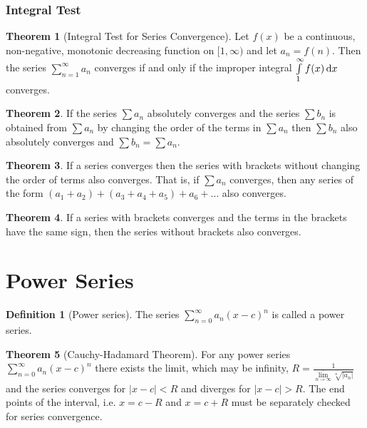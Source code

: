 \documentclass[fleqn, a4paper, 8pt, twoside]{amsart}
\theoremstyle{definition}
\theoremstyle{bluedefinition}
\newtheorem{definition}{Definition}
\theoremstyle{redtheorem}
\newtheorem{theorem}{Theorem}
\begin{document}
\begin{multicols}{2}
\begin{spacing}{0.7}
\subsubsection{Integral Test}

\begin{theorem}[Integral Test for Series Convergence]
	Let $f(x)$ be a continuous, non-negative, monotonic decreasing function on $[1,\infty)$ and let $a_n = f(n)$.
	Then the series $\sum\limits_{n = 1}^{\infty} a_n$ converges if and only if the improper integral $\int\limits_{1}^{\infty} f(x) \dif x$ converges.
	\label{Integral Test for Series Convergence}
\end{theorem}

\begin{theorem}
	If the series $\sum a_n$ absolutely converges and the series $\sum b_n$ is obtained from $\sum a_n$ by changing the order of the terms in $\sum a_n$ then $\sum b_n$ also absolutely converges and $\sum b_n = \sum a_n$.
\end{theorem}

\begin{theorem}
	If a series converges then the series with brackets without changing the order of terms also converges.
	That is, if $\sum a_n$ converges, then any series of the form $(a_1 + a_2) + (a_3 + a_4 + a_5) + a_6 + \dots$ also converges.
\end{theorem}

\begin{theorem}
	If a series with brackets converges and the terms in the brackets have the same sign, then the series without brackets also converges.
\end{theorem}

\section{Power Series}

\begin{definition}[Power series]
	The series $\sum\limits_{n = 0}^{\infty} a_n (x - c)^n$ is called a power series.
\end{definition}

\begin{theorem}[Cauchy-Hadamard Theorem]
	For any power series $\sum\limits_{n = 0}^{\infty} a_n (x - c)^n$ there exists the limit, which may be infinity, $R = \frac{1}{\overline{\lim\limits_{n \to \infty}} \sqrt[n]{|a_n|}}$	and the series converges for $|x - c| < R$ and diverges for $|x - c| > R$.
	The end points of the interval, i.e. $x = c - R$ and $x = c + R$ must be separately checked for series convergence.
\end{theorem}


\end{spacing}
\end{multicols}
\end{document}
